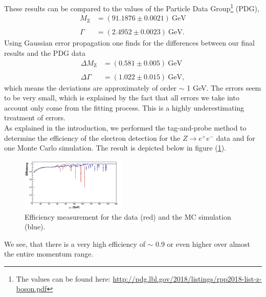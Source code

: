 \documentclass[twocolumn,
			   showpacs,%
               nofootinbib,
               aps,%
               prd,
               notitlepage,
               showkeys,
               10pt]{revtex4-1}
\begin{document}
These results can be compared to the values of the Particle Data Group\footnote{The values can be found here: \url{http://pdg.lbl.gov/2018/listings/rpp2018-list-z-boson.pdf}} (PDG), 
\begin{align}
	M_{\mathrm{Z}}&=(91.1876 \pm 0.0021) \ \mathrm{GeV} \\  \nonumber\\ \Gamma&=(2.4952 \pm 0.0023) \ \mathrm{GeV}.
\end{align} 
Using Gaussian error propagation one finds for the differences between our final results and the PDG data
\begin{align}
	\Delta M_{\mathrm{Z}}&=(0.581 \pm 0.005) \ \mathrm{GeV} \\  \nonumber\\ 
	\Delta\Gamma&=(1.022 \pm 0.015) \ \mathrm{GeV},
\end{align} 
which means the deviations are approximately of order $\sim$ 1 GeV. The errors seem to be very small, which is explained by the fact that all errors we take into account only come from the fitting process. This is a highly underestimating treatment of errors.\\

As explained in the introduction, we performed the tag-and-probe method to determine the efficiency of the electron detection for the $Z\rightarrow e^+e^-$ data and for one Monte Carlo simulation. The result is depicted below in figure (\ref{fig:eff}).

\begin{figure}[H]
\centering
\includegraphics[width=0.45\textwidth]{figures/plots/Efficiency_corr}
\caption{Efficiency measurement for the data (red) and the MC simulation (blue).}
\label{fig:eff}
\end{figure}
We see, that there is a very high efficiency of $\sim$ 0.9 or even higher over almost the entire momentum range.
\end{document}

